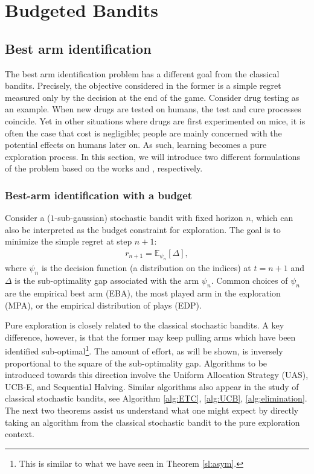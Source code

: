 \documentclass[10pt,a4article]{article}
\numberwithin{equation}{section}
\theoremstyle{plain}
\theoremstyle{definition}
\def\E{{\mathbb E}}
\begin{document}
\newpage

\section{Budgeted Bandits}
\subsection{Best arm identification}
The best arm identification problem has a different goal from the classical bandits. Precisely, the objective considered in the former is a simple regret measured only by the decision at the end of the game. Consider drug testing as an example. When new drugs are tested on humans, the test and cure processes coincide. Yet in other situations where drugs are first experimented on mice, it is often the case that cost is negligible; people are mainly concerned with the potential effects on humans later on. As such, learning becomes a pure exploration process. In this section, we will introduce two different formulations of the problem based on the works \cite{audibert2010best,  bubeck2009pure} and \cite{garivier2016optimal}, respectively. 

\subsubsection{Best-arm identification with a budget}

Consider a ($1$-sub-gaussian) stochastic bandit with fixed horizon $n$, which can also be interpreted as the budget constraint for exploration.  The goal is to minimize the simple regret at step $n+1$:
\begin{align*}
r_{n+1} = \E_{\psi_n}[\Delta],
\end{align*}
where $\psi_n$ is the decision function (a distribution on the indices) at $t=n+1$ and $\Delta$ is the sub-optimality gap associated with the arm $\psi_n$. Common choices of $\psi_n$ are the empirical best arm (EBA), the most played arm in the exploration (MPA), or the empirical distribution of plays (EDP). 

Pure exploration is closely related to the classical stochastic bandits. A key difference, however, is that the former may keep pulling arms which have been identified sub-optimal\footnote{This is similar to what we have seen in Theorem \ref{sl:asym}.}. The amount of effort, as will be shown, is inversely proportional to the square of the sub-optimality gap. Algorithms to be introduced towards this direction involve the Uniform Allocation Strategy (UAS),  UCB-E, and Sequential Halving. Similar algorithms also appear in the study of classical stochastic bandits, see Algorithm \ref{alg:ETC}, \ref{alg:UCB}, \ref{alg:elimination}. The next two theorems assist us understand what one might expect by directly taking an algorithm from the classical stochastic bandit to the pure exploration context. 
\end{document}
